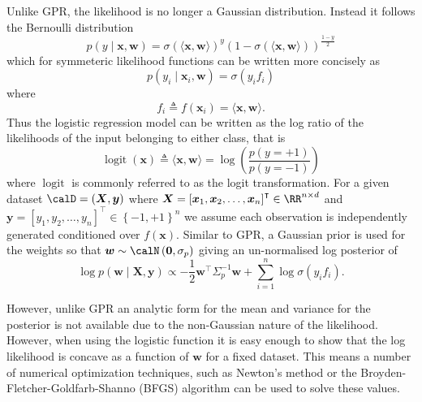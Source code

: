 Unlike GPR, the likelihood is no longer a Gaussian distribution. Instead it follows the Bernoulli distribution
\begin{equation*}
    p \left( y \mid \bm{x} , \bm{w} \right) = \sigma \left( \langle \bm{x} , \bm{w} \rangle \right)^{y} \left( 1 - \sigma \left( \langle \bm{x} , \bm{w} \rangle \right) \right)^{\frac{1 - y}{2}}
\end{equation*}
which for symmeteric likelihood functions can be written more concisely as
\begin{equation*}
    p \left( y_i \mid \bm{x}_i , \bm{w} \right) = \sigma \left( y_i f_i \right)
\end{equation*}
where
\begin{equation} \label{eq: GPC-lin-latent-func}
    f_i \triangleq f \left( \bm{x}_i \right) = \langle \bm{x} , \bm{w} \rangle .
\end{equation}
Thus the logistic regression model can be written as the log ratio of the likelihoods of the input belonging to either class, that is
\begin{equation*}
    \operatorname{logit} \left( \bm{x} \right) \triangleq \langle \bm{x} , \bm{w} \rangle = \log \left( \frac{p \left( y = +1 \right)}{p \left( y = -1 \right)} \right)
\end{equation*}
where $\operatorname{logit}$ is commonly referred to as the logit transformation. For a given dataset $\calD = \left( \bm{X} , \bm{y} \right)$ where $\bm{X} = \left[ \bm{x}_1 , \bm{x}_2 , \ldots , \bm{x}_n \right]^{\intercal} \in \RR^{n \times d}$ and $\bm{y} = \left[ y_1 , y_2 , \ldots , y_n \right]^{\intercal} \in \left\{ -1,+1 \right\}^{n}$ we assume each observation is independently generated conditioned over $f \left( \bm{x} \right)$. Similar to GPR, a Gaussian prior is used for the weights so that $\bm{w} \sim \calN \left( \bm{0} , \sigma_p \right)$ giving an un-normalised log posterior of
\begin{equation*}
    \log p \left( \bm{w} \mid \bm{X} , \bm{y} \right) \propto - \frac{1}{2} \bm{w}^{\intercal} \Sigma_p^{-1} \bm{w} + \sum_{i=1}^{n} \log \sigma \left( y_i f_i \right).
\end{equation*}

However, unlike GPR an analytic form for the mean and variance for the posterior is not available due to the non-Gaussian nature of the likelihood. However, when using the logistic function it is easy enough to show that the log likelihood is concave as a function of $\bm{w}$ for a fixed dataset. This means a number of numerical optimization techniques, such as Newton's method or the Broyden-Fletcher-Goldfarb-Shanno (BFGS) algorithm \cite{FletcherR2000PMoO} can be used to solve these values.

